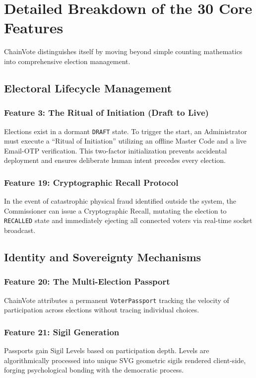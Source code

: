 \documentclass[journal,10pt,twocolumn]{IEEEtran}
\begin{document}
\section{Detailed Breakdown of the 30 Core Features}

ChainVote distinguishes itself by moving beyond simple counting mathematics into comprehensive election management.

\subsection{Electoral Lifecycle Management}

\subsubsection{Feature 3: The Ritual of Initiation (Draft to Live)}
Elections exist in a dormant \texttt{DRAFT} state. To trigger the start, an Administrator must execute a ``Ritual of Initiation'' utilizing an offline Master Code and a live Email-OTP verification. This two-factor initialization prevents accidental deployment and ensures deliberate human intent precedes every election.

\subsubsection{Feature 19: Cryptographic Recall Protocol}
In the event of catastrophic physical fraud identified outside the system, the Commissioner can issue a Cryptographic Recall, mutating the election to \texttt{RECALLED} state and immediately ejecting all connected voters via real-time socket broadcast.

\subsection{Identity and Sovereignty Mechanisms}

\subsubsection{Feature 20: The Multi-Election Passport}
ChainVote attributes a permanent \texttt{VoterPassport} tracking the velocity of participation across elections without tracing individual choices.

\subsubsection{Feature 21: Sigil Generation}
Passports gain Sigil Levels based on participation depth. Levels are algorithmically processed into unique SVG geometric sigils rendered client-side, forging psychological bonding with the democratic process.
\end{document}

